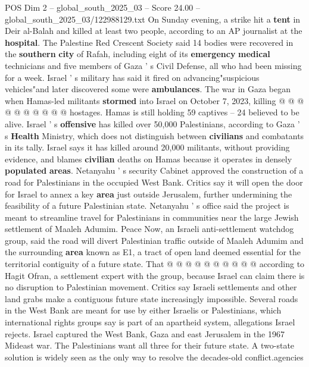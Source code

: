 \begin{textsample}{POS Dim 2 – global\_south\_2025\_03 – Score 24.00 – global\_south\_2025\_03/122988129.txt}
On Sunday evening, a strike hit a \textbf{tent} in Deir al-Balah and killed at least two people, according to an AP journalist at the \textbf{hospital}.
The Palestine Red Crescent Society said 14 bodies were recovered in the \textbf{southern} \textbf{city} of Rafah, including eight of its \textbf{emergency} \textbf{medical} technicians and five members of Gaza ' s Civil Defense, all who had been missing for a week.
Israel ' s military has said it fired on advancing"suspicious vehicles"and later discovered some were \textbf{ambulances}.
The war in Gaza began when Hamas-led militants \textbf{stormed} into Israel on October 7, 2023, killing @ @ @ @ @ @ @ @ @ @ hostages.
Hamas is still holding 59 captives -- 24 believed to be alive.
Israel ' s \textbf{offensive} has killed over 50,000 Palestinians, according to Gaza ' s \textbf{Health} Ministry, which does not distinguish between \textbf{civilians} and combatants in its tally.
Israel says it has killed around 20,000 militants, without providing evidence, and blames \textbf{civilian} deaths on Hamas because it operates in densely \textbf{populated} \textbf{areas}.
Netanyahu ' s security Cabinet approved the construction of a road for Palestinians in the occupied West Bank.
Critics say it will open the door for Israel to annex a key \textbf{area} just outside Jerusalem, further undermining the feasibility of a future Palestinian state.
Netanyahu ' s office said the project is meant to streamline travel for Palestinians in communities near the large Jewish settlement of Maaleh Adumim.
Peace Now, an Israeli anti-settlement watchdog group, said the road will divert Palestinian traffic outside of Maaleh Adumim and the surrounding \textbf{area} known as E1, a tract of open land deemed essential for the territorial contiguity of a future state.
That @ @ @ @ @ @ @ @ @ @ according to Hagit Ofran, a settlement expert with the group, because Israel can claim there is no disruption to Palestinian movement.
Critics say Israeli settlements and other land grabs make a contiguous future state increasingly impossible.
Several roads in the West Bank are meant for use by either Israelis or Palestinians, which international rights groups say is part of an apartheid system, allegations Israel rejects.
Israel captured the West Bank, Gaza and east Jerusalem in the 1967 Mideast war.
The Palestinians want all three for their future state.
A two-state solution is widely seen as the only way to resolve the decades-old conflict.agencies

\end{textsample}
